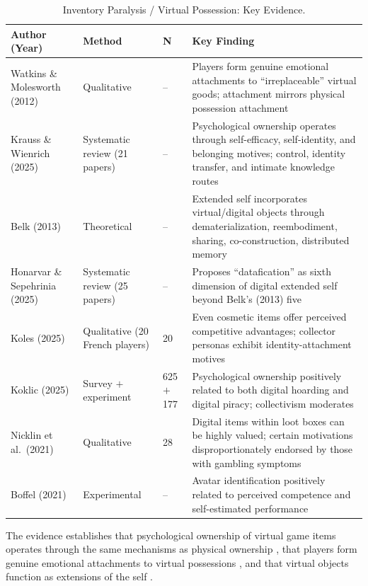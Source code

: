 \documentclass[12pt]{article}
\begin{document}
\begin{table}[ht]
\centering
\caption{Inventory Paralysis / Virtual Possession: Key Evidence.}
\small
\begin{tabular}{p{3.2cm}p{3cm}p{1.5cm}p{6cm}}
\toprule
Author (Year) & Method & N & Key Finding \\
\midrule
Watkins \& Molesworth (2012) & Qualitative & -- & Players form genuine emotional attachments to ``irreplaceable'' virtual goods; attachment mirrors physical possession attachment \\
Krauss \& Wienrich (2025) & Systematic review (21 papers) & -- & Psychological ownership operates through self-efficacy, self-identity, and belonging motives; control, identity transfer, and intimate knowledge routes \\
Belk (2013) & Theoretical & -- & Extended self incorporates virtual/digital objects through dematerialization, reembodiment, sharing, co-construction, distributed memory \\
Honarvar \& Sepehrinia (2025) & Systematic review (25 papers) & -- & Proposes ``datafication'' as sixth dimension of digital extended self beyond Belk's (2013) five \\
Koles (2025) & Qualitative (20 French players) & 20 & Even cosmetic items offer perceived competitive advantages; collector personas exhibit identity-attachment motives \\
Koklic (2025) & Survey $+$ experiment & 625 $+$ 177 & Psychological ownership positively related to both digital hoarding and digital piracy; collectivism moderates \\
Nicklin et al.\ (2021) & Qualitative & 28 & Digital items within loot boxes can be highly valued; certain motivations disproportionately endorsed by those with gambling symptoms \\
Boffel (2021) & Experimental & -- & Avatar identification positively related to perceived competence and self-estimated performance \\
\bottomrule
\end{tabular}
\end{table}

The evidence establishes that psychological ownership of virtual game items operates through the same mechanisms as physical ownership \citep{Krauss2025}, that players form genuine emotional attachments to virtual possessions \citep{Watkins2012}, and that virtual objects function as extensions of the self \citep{Belk2013, Honarvar2025}.
\end{document}
